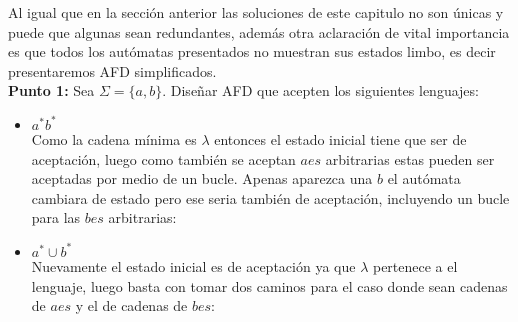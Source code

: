 
Al igual que en la sección anterior las soluciones de este capitulo no son únicas y puede que algunas sean redundantes, además otra aclaración de vital importancia es que todos los autómatas presentados no muestran sus estados limbo, es decir presentaremos AFD simplificados.\\

\textbf{Punto 1: }Sea $\Sigma=\{a,b\}.$ Diseñar AFD que acepten los siguientes lenguajes:
\begin{itemize}[label={$\bullet$}]
    \item $a^*b^*$\\

     Como la cadena mínima es $\lambda$ entonces el estado inicial tiene que ser de aceptación, luego como también se aceptan $aes$ arbitrarias estas pueden ser aceptadas por medio de un bucle. Apenas aparezca una $b$ el autómata cambiara de estado pero ese seria también de aceptación, incluyendo un bucle para las $bes$ arbitrarias:\\
    \begin{basedtikz}
    \centering
    \end{basedtikz}

    \item $a^*\cup b^*$\\

     Nuevamente el estado inicial es de aceptación ya que $\lambda$ pertenece a el lenguaje, luego basta con tomar dos caminos para el caso donde sean cadenas de $aes$ y el de cadenas de $bes$:

      
    \begin{basedtikz}
    \centering
    \end{basedtikz}


\end{itemize}
